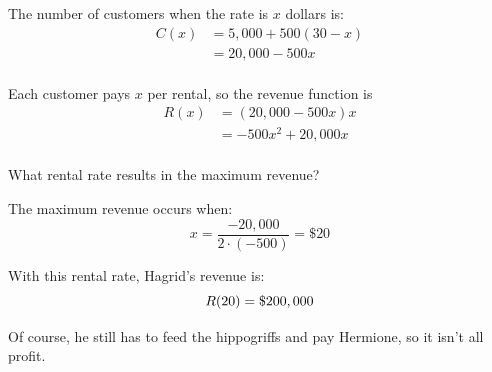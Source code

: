 \documentclass[fleqn,addpoints]{exam}
\begin{document}
\begin{questions}
\begin{parts}
        \begin{solution}[8 cm]
          The number of customers when the rate is $x$ dollars is: 
          \begin{align*}
            C(x) &= 5,000 + 500(30 - x) \\
                 &= 20,000 - 500x \\
          \end{align*}

          Each customer pays $x$ per rental, so the revenue function is
          \begin{align*}
            R(x) &= (20,000 - 500x)x \\
                 &= -500x^2 + 20,000 x \\
          \end{align*}
        \end{solution}

  \ifprintanswers
    \pagebreak
  \fi

      \bonuspart[5] What rental rate results in the maximum revenue?
        \begin{solution}[4 cm]
          The maximum revenue occurs when:
          \[
            x = \frac{-20,000}{2 \cdot (-500)} = \$20
          \]

          With this rental rate, Hagrid's revenue is:
          \[
            R(20) = \$200,000 \\
          \]

          Of course, he still has to feed the hippogriffs and pay Hermione, so it isn't all profit.

        \end{solution}

    \end{parts}

\end{questions}
\end{document}
